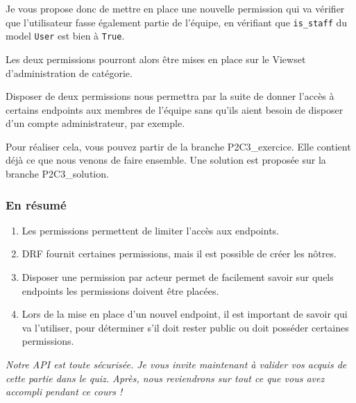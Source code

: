 Je vous propose donc de mettre en place une {\color{monOrange}nouvelle permission} qui va vérifier que l’utilisateur fasse également partie de l’équipe, en vérifiant que {\tt is\_staff}  du model {\tt User}  est bien à {\tt True}.

Les deux permissions pourront alors être mises en place sur le Viewset d’administration de catégorie.

Disposer de deux permissions nous permettra par la suite de donner l’accès à certains endpoints aux membres de l’équipe sans qu’ils aient besoin de disposer d’un compte administrateur, par exemple.

Pour réaliser cela, vous pouvez partir de la branche P2C3\_exercice. Elle contient déjà ce que nous venons de faire ensemble. Une solution est proposée sur la branche P2C3\_solution.

\subsubsection*{En résumé}
\begin{enumerate}
\item Les permissions permettent de limiter l’accès aux endpoints.
\item DRF fournit certaines permissions, mais il est possible de créer les nôtres.
\item Disposer une permission par acteur permet de facilement savoir sur quels endpoints les permissions doivent être placées.
\item Lors de la mise en place d’un nouvel endpoint, il est important de savoir qui va l’utiliser, pour déterminer s’il doit rester public ou doit posséder certaines permissions.
\end{enumerate}
{\em Notre API est toute sécurisée. Je vous invite maintenant à valider vos acquis de cette partie dans le quiz. Après, nous reviendrons sur tout ce que vous avez accompli pendant ce cours !}




%










